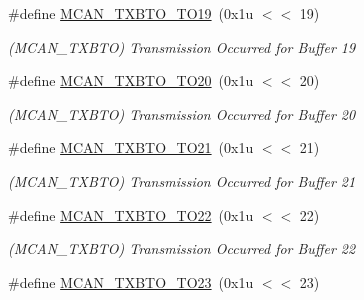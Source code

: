 \begin{DoxyCompactItemize}
\mbox{\label{group__SAME70__MCAN_gad3ab535f40c71f500185608c199bec58}} 
\#define \mbox{\hyperlink{group__SAME70__MCAN_gad3ab535f40c71f500185608c199bec58}{M\+C\+A\+N\+\_\+\+T\+X\+B\+T\+O\+\_\+\+T\+O19}}~(0x1u $<$$<$ 19)
\begin{DoxyCompactList}\small\item\em (M\+C\+A\+N\+\_\+\+T\+X\+B\+TO) Transmission Occurred for Buffer 19 \end{DoxyCompactList}\item 
\mbox{\label{group__SAME70__MCAN_ga5559af5a4bc378f4cda7a2fcc1203ac6}} 
\#define \mbox{\hyperlink{group__SAME70__MCAN_ga5559af5a4bc378f4cda7a2fcc1203ac6}{M\+C\+A\+N\+\_\+\+T\+X\+B\+T\+O\+\_\+\+T\+O20}}~(0x1u $<$$<$ 20)
\begin{DoxyCompactList}\small\item\em (M\+C\+A\+N\+\_\+\+T\+X\+B\+TO) Transmission Occurred for Buffer 20 \end{DoxyCompactList}\item 
\mbox{\label{group__SAME70__MCAN_ga0a912d50ed7091d99b45ed77c03f0d95}} 
\#define \mbox{\hyperlink{group__SAME70__MCAN_ga0a912d50ed7091d99b45ed77c03f0d95}{M\+C\+A\+N\+\_\+\+T\+X\+B\+T\+O\+\_\+\+T\+O21}}~(0x1u $<$$<$ 21)
\begin{DoxyCompactList}\small\item\em (M\+C\+A\+N\+\_\+\+T\+X\+B\+TO) Transmission Occurred for Buffer 21 \end{DoxyCompactList}\item 
\mbox{\label{group__SAME70__MCAN_gad8b5e8718c498503bc19e14b9d2d36da}} 
\#define \mbox{\hyperlink{group__SAME70__MCAN_gad8b5e8718c498503bc19e14b9d2d36da}{M\+C\+A\+N\+\_\+\+T\+X\+B\+T\+O\+\_\+\+T\+O22}}~(0x1u $<$$<$ 22)
\begin{DoxyCompactList}\small\item\em (M\+C\+A\+N\+\_\+\+T\+X\+B\+TO) Transmission Occurred for Buffer 22 \end{DoxyCompactList}\item 
\mbox{\label{group__SAME70__MCAN_ga4990e0d40074c782a2a67f068dbf981d}} 
\#define \mbox{\hyperlink{group__SAME70__MCAN_ga4990e0d40074c782a2a67f068dbf981d}{M\+C\+A\+N\+\_\+\+T\+X\+B\+T\+O\+\_\+\+T\+O23}}~(0x1u $<$$<$ 23)
$$
\end{DoxyCompactItemize}
